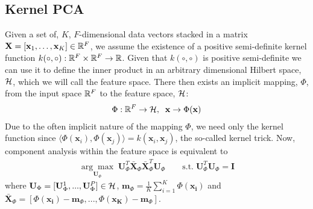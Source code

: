 \subsection{Kernel PCA}\label{subsec:singl_img_ca_kpca}
Given a set of, $K$, $F$-dimensional data vectors stacked in a
matrix $\mathbf{X} = [\mathbf{x}_1, \ldots, \mathbf{x}_K] \in \mathbb{R}^F$, 
we assume the existence of a positive semi-definite kernel function 
$k(\circ, \circ) : \mathbb{R}^F \times \mathbb{R}^F \rightarrow \mathbb{R}$. Given that $k(\circ, \circ)$ 
is positive semi-definite we can use it to define the inner product in an 
arbitrary dimensional Hilbert space, $\mathcal{H}$, which we will call the feature 
space. There then exists an implicit mapping, $\Phi$, from the input 
space $\mathbb{R}^F$ to the feature space, $\mathcal{H}$:
\begin{equation}
    \begin{aligned}\label{eq:implicit-map}
        \Phi : \mathbb{R}^F \rightarrow \mathcal{H}, \; \; \mathbf{x} \rightarrow \Phi(\mathbf{x})
    \end{aligned}
\end{equation}
Due to the often implicit nature of the mapping $\Phi$, we need only the kernel 
function since 
$\langle \Phi(\mathbf{x}_i), \Phi(\mathbf{x}_j) \rangle  = k (\mathbf{x}_i, \mathbf{x}_j)$, 
the so-called kernel trick. Now, component analysis within the feature space 
is equivalent to
\begin{equation}
    \begin{aligned}\label{eq:feature-space-pca}
        \underset{\mathbf{U}_\Phi}{\arg\max} \; \mathbf{U}_\Phi^T \bar{\mathbf{X}}_\Phi \bar{\mathbf{X}}_\Phi^T \mathbf{U}_\Phi \qquad \text{s.t.} \; \mathbf{U}_\Phi^T \mathbf{U}_\Phi = \mathbf{I}
    \end{aligned}
\end{equation}
where $\mathbf{U}_\Phi = [\mathbf{U}_\Phi^1, ..., \mathbf{U}_\Phi^P] \in \mathcal{H}$,
$\mathbf{m}_\Phi = \frac{1}{K} \sum \limits_{i=1}^K \Phi(\mathbf{x_i})$ and
$\bar{\mathbf{X}}_\Phi = [\Phi(\mathbf{x_i}) - \mathbf{m}_\Phi, ..., \Phi(\mathbf{x_K}) - \mathbf{m}_\Phi]$.

